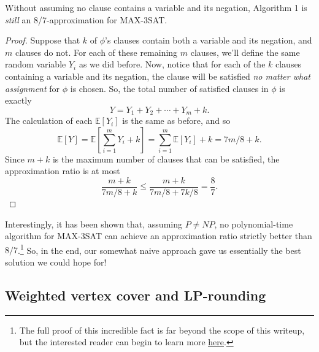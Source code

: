 \documentclass{article}
\newenvironment{proposition}[2][Proposition]{\begin{trivlist}
\item[\hskip \labelsep {\bfseries #1}\hskip \labelsep {\hspace{-1ex}\bfseries #2.}]}{\end{trivlist}}
\begin{document}
\begin{proposition}{ 4.2}{}
    Without assuming no clause contains a variable and its negation, Algorithm 1 is \textit{still} an 8/7-approximation for MAX-3SAT.
\end{proposition}

\begin{proof}
    Suppose that $k$ of $\phi$'s clauses contain both a variable and its negation, and $m$ clauses do not. For each of these remaining $m$ clauses, we'll define the same random variable $Y_i$ as we did before. Now, notice that for each of the $k$ clauses containing a variable and its negation, the clause will be satisfied \textit{no matter what assignment} for $\phi$ is chosen. So, the total number of satisfied clauses in $\phi$ is exactly
    \[
    Y = Y_1 + Y_2 + \cdots + Y_m + k.
    \]
    The calculation of each $\mathbb{E}[Y_i]$ is the same as before, and so
    \[
    \mathbb{E}[Y] = \mathbb{E} \left[ \sum_{i=1}^{m} Y_i + k \right] = \sum_{i=1}^{m} \mathbb{E} \left[  Y_i \right] + k = 7m/8 + k.
    \]
    Since $m + k$ is the maximum number of clauses that can be satisfied, the approximation ratio is at most
    \[
    \frac{m+k}{7m/8 + k} \leq \frac{m+k}{7m/8 + 7k/8} = \frac{8}{7}.
    \]
\end{proof}

\noindent Interestingly, it has been shown that, assuming $P \neq NP$, no polynomial-time algorithm for MAX-3SAT can achieve an approximation ratio strictly better than $8/7$.\footnote{The full proof of this incredible fact is far beyond the scope of this writeup, but the interested reader can begin to learn more \href{https://en.wikipedia.org/wiki/MAX-3SAT}{\underline{here}}.} So, in the end, our somewhat naive approach gave us essentially the best solution we could hope for!

\subsection{Weighted vertex cover and LP-rounding}
\end{document}
